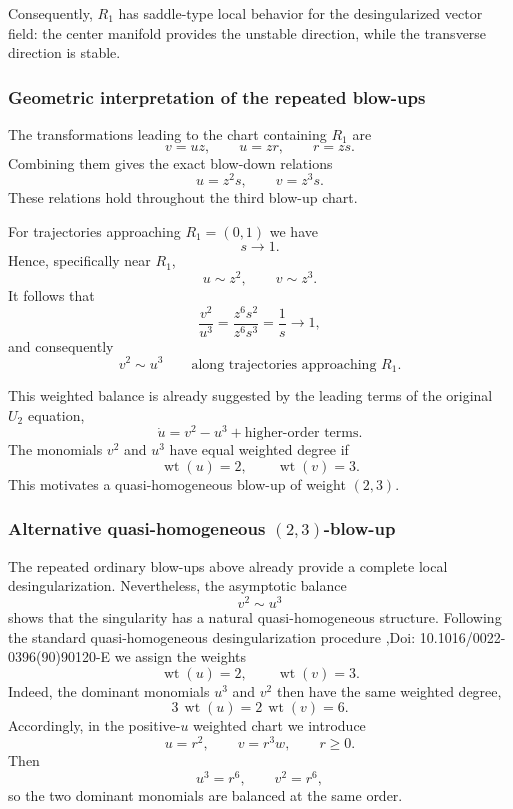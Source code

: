\documentclass[11pt,reqno]{amsart}
\theoremstyle{plain}
\theoremstyle{definition}
\theoremstyle{remark}
\begin{document}
Consequently, $R_1$ has saddle-type local behavior for the
desingularized vector field: the center manifold provides the
unstable direction, while the transverse direction is stable.

\subsubsection{Geometric interpretation of the repeated blow-ups}
\label{subsubsec:blowup-geometry}

The transformations leading to the chart containing $R_1$ are
\[
v=uz,
\qquad
u=zr,
\qquad
r=zs.
\]
Combining them gives the exact blow-down relations
\begin{equation}
\label{eq:combined-blowdown}
\boxed{
u=z^2s,
\qquad
v=z^3s.
}
\end{equation}
These relations hold throughout the third blow-up chart.

For trajectories approaching $R_1=(0,1)$ we have
\[
s\longrightarrow1.
\]
Hence, specifically near $R_1$,
\[
u\sim z^2,
\qquad
v\sim z^3.
\]
It follows that
\[
\frac{v^2}{u^3}
=
\frac{z^6s^2}{z^6s^3}
=
\frac1s
\longrightarrow1,
\]
and consequently
\begin{equation}
\label{eq:cusp-balance}
\boxed{
v^2\sim u^3
\qquad
\text{along trajectories approaching }R_1.
}
\end{equation}

This weighted balance is already suggested by the leading terms of
the original $U_2$ equation,
\[
\dot u
=
v^2-u^3+\text{higher-order terms}.
\]
The monomials $v^2$ and $u^3$ have equal weighted degree if
\[
\operatorname{wt}(u)=2,
\qquad
\operatorname{wt}(v)=3.
\]
This motivates a quasi-homogeneous blow-up of weight $(2,3)$.


\subsubsection{Alternative quasi-homogeneous $(2,3)$-blow-up}
\label{subsubsec:weighted-blowup}

The repeated ordinary blow-ups above already provide a complete local
desingularization. Nevertheless, the asymptotic balance
\[
v^2\sim u^3
\]
shows that the singularity has a natural quasi-homogeneous structure.
Following the standard quasi-homogeneous desingularization procedure
\cite{DumortierLlibreArtes2006,BrunellaMiari1990,Pelletier1995},Doi: 10.1016/0022-0396(90)90120-E
we assign the weights
\[
\operatorname{wt}(u)=2,
\qquad
\operatorname{wt}(v)=3.
\]
Indeed, the dominant monomials $u^3$ and $v^2$ then have the same
weighted degree,
\[
3\,\operatorname{wt}(u)
=
2\,\operatorname{wt}(v)
=
6.
\]
Accordingly, in the positive-$u$ weighted chart we introduce
\begin{equation}
\label{eq:weighted-blowup}
u=r^2,
\qquad
v=r^3w,
\qquad r\geq0.
\end{equation}
Then
\[
u^3=r^6,
\qquad
v^2=r^6,
\]
so the two dominant monomials are balanced at the same order.
\end{document}
